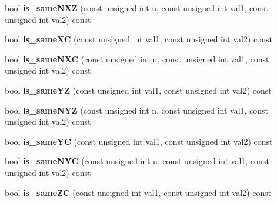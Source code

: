 \begin{DoxyCompactItemize}
\item 
\hypertarget{structcimg__library_1_1CImgList_ad81d356d5ac11b7cd44950e406e7a63d}{
bool {\bfseries is\_\-sameNXZ} (const unsigned int n, const unsigned int val1, const unsigned int val2) const }
\label{structcimg__library_1_1CImgList_ad81d356d5ac11b7cd44950e406e7a63d}

\item 
\hypertarget{structcimg__library_1_1CImgList_ab2e3a7bb3b47401b4f27c6f007ff8499}{
bool {\bfseries is\_\-sameXC} (const unsigned int val1, const unsigned int val2) const }
\label{structcimg__library_1_1CImgList_ab2e3a7bb3b47401b4f27c6f007ff8499}

\item 
\hypertarget{structcimg__library_1_1CImgList_aa819043b1d1241b751dab806a57f974e}{
bool {\bfseries is\_\-sameNXC} (const unsigned int n, const unsigned int val1, const unsigned int val2) const }
\label{structcimg__library_1_1CImgList_aa819043b1d1241b751dab806a57f974e}

\item 
\hypertarget{structcimg__library_1_1CImgList_a42acdfb75653787bc0d2c5f17b88e79d}{
bool {\bfseries is\_\-sameYZ} (const unsigned int val1, const unsigned int val2) const }
\label{structcimg__library_1_1CImgList_a42acdfb75653787bc0d2c5f17b88e79d}

\item 
\hypertarget{structcimg__library_1_1CImgList_a929332e3b999e70793574aa310e704e8}{
bool {\bfseries is\_\-sameNYZ} (const unsigned int n, const unsigned int val1, const unsigned int val2) const }
\label{structcimg__library_1_1CImgList_a929332e3b999e70793574aa310e704e8}

\item 
\hypertarget{structcimg__library_1_1CImgList_ac073c209bfecb9a758e7d55149e5bde9}{
bool {\bfseries is\_\-sameYC} (const unsigned int val1, const unsigned int val2) const }
\label{structcimg__library_1_1CImgList_ac073c209bfecb9a758e7d55149e5bde9}

\item 
\hypertarget{structcimg__library_1_1CImgList_ada07e63cad808e0447fd2fc0313ac2e8}{
bool {\bfseries is\_\-sameNYC} (const unsigned int n, const unsigned int val1, const unsigned int val2) const }
\label{structcimg__library_1_1CImgList_ada07e63cad808e0447fd2fc0313ac2e8}

\item 
\hypertarget{structcimg__library_1_1CImgList_a4b43b177846cdc8fbafcbdf738dc8435}{
bool {\bfseries is\_\-sameZC} (const unsigned int val1, const unsigned int val2) const }
\label{structcimg__library_1_1CImgList_a4b43b177846cdc8fbafcbdf738dc8435}


\end{DoxyCompactItemize}
